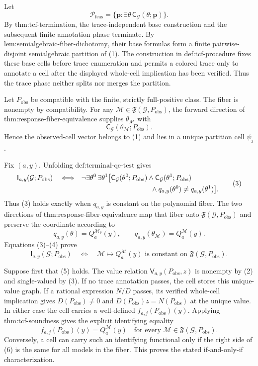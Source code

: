 Let
\[
\mathcal P_{\mathrm{feas}}
=\{\mathbf p:\exists\theta\,\mathsf C_{\mathcal G}(\theta;\mathbf p)\}.
\tag{1}
\]
By \(\text{thm:tcf-termination}\), the trace-independent base construction and the subsequent finite annotation phase terminate.  By \(\text{lem:semialgebraic-fiber-dichotomy}\), their base formulas form a finite pairwise-disjoint semialgebraic partition of (1).  The construction in \(\text{def:tcf-procedure}\) fixes these base cells before trace enumeration and permits a colored trace only to annotate a cell after the displayed whole-cell implication has been verified.  Thus the trace phase neither splits nor merges the partition.

Let \(P_{\mathrm{obs}}\) be compatible with the finite, strictly full-positive class.  The fiber is nonempty by compatibility.  For any \(\mathcal M\in\mathfrak F(\mathcal G,P_{\mathrm{obs}})\), the forward direction of \(\text{thm:response-fiber-equivalence}\) supplies \(\theta_{\mathcal M}\) with
\[
\mathsf C_{\mathcal G}(\theta_{\mathcal M};P_{\mathrm{obs}}).
\tag{2}
\]
Hence the observed-cell vector belongs to (1) and lies in a unique partition cell \(\psi_j\).

Fix \((a,y)\).  Unfolding \(\text{def:terminal-qe-test}\) gives
\[
\begin{aligned}
\mathsf I_{a,y}(\mathcal G;P_{\mathrm{obs}})
\quad\Longleftrightarrow\quad
&\neg\exists\theta^0\,\exists\theta^1
\bigl[
\mathsf C_{\mathcal G}(\theta^0;P_{\mathrm{obs}})
\wedge\mathsf C_{\mathcal G}(\theta^1;P_{\mathrm{obs}})\\
&\hspace{35mm}\wedge q_{a,y}(\theta^0)\neq q_{a,y}(\theta^1)
\bigr].
\end{aligned}
\tag{3}
\]
Thus (3) holds exactly when \(q_{a,y}\) is constant on the polynomial fiber.  The two directions of \(\text{thm:response-fiber-equivalence}\) map that fiber onto \(\mathfrak F(\mathcal G,P_{\mathrm{obs}})\) and preserve the coordinate according to
\[
q_{a,y}(\theta)=Q_a^{\mathcal M_\theta}(y),
\qquad
q_{a,y}(\theta_{\mathcal M})=Q_a^{\mathcal M}(y).
\tag{4}
\]
Equations (3)--(4) prove
\[
\mathsf I_{a,y}(\mathcal G;P_{\mathrm{obs}})
\quad\Longleftrightarrow\quad
\mathcal M\longmapsto Q_a^{\mathcal M}(y)
\text{ is constant on }\mathfrak F(\mathcal G,P_{\mathrm{obs}}).
\tag{5}
\]

Suppose first that (5) holds.  The value relation \(\mathsf V_{a,y}(P_{\mathrm{obs}},z)\) is nonempty by (2) and single-valued by (3).  If no trace annotation passes, the cell stores this unique-value graph.  If a rational expression \(N/D\) passes, its verified whole-cell implication gives \(D(P_{\mathrm{obs}})\neq0\) and \(D(P_{\mathrm{obs}})z=N(P_{\mathrm{obs}})\) at the unique value.  In either case the cell carries a well-defined \(f_{a,j}(P_{\mathrm{obs}})(y)\).  Applying \(\text{thm:tcf-soundness}\) gives the explicit identifying equality
\[
f_{a,j}(P_{\mathrm{obs}})(y)=Q_a^{\mathcal M}(y)
\quad
\text{for every }\mathcal M\in\mathfrak F(\mathcal G,P_{\mathrm{obs}}).
\tag{6}
\]
Conversely, a cell can carry such an identifying functional only if the right side of (6) is the same for all models in the fiber.  This proves the stated if-and-only-if characterization.


